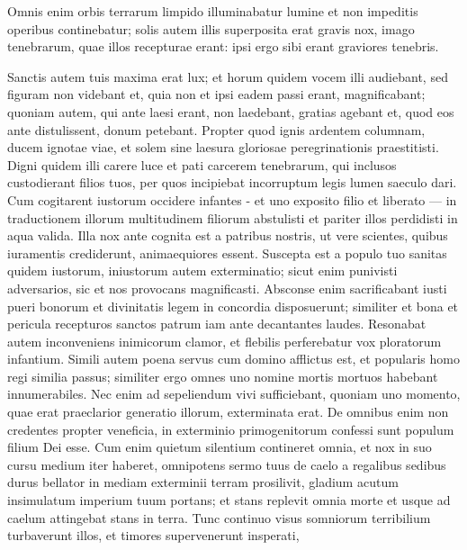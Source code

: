 \begin{biblechapter}
\begin{biblechapter}
\begin{biblechapter}
\begin{biblechapter}
\begin{biblechapter}
\begin{biblechapter}
\begin{biblechapter}
\begin{biblechapter}
\begin{biblechapter}
\begin{biblechapter}
\begin{biblechapter}
\begin{biblechapter}
\begin{biblechapter}
\begin{biblechapter}
\begin{biblechapter}
\begin{biblechapter}
\begin{biblechapter}
 \verse Omnis enim orbis terrarum limpido illuminabatur lumine
 et non impeditis operibus continebatur;
 \verse solis autem illis superposita erat gravis nox,
 imago tenebrarum, quae illos recepturae erant:
 ipsi ergo sibi erant graviores tenebris.
 
\begin{biblechapter}
\verse Sanctis autem tuis maxima erat lux;
 et horum quidem vocem illi audiebant, sed figuram non videbant
 et, quia non et ipsi eadem passi erant, magnificabant;
 \verse quoniam autem, qui ante laesi erant, non laedebant, gratias agebant
 et, quod eos ante distulissent, donum petebant.
 \verse Propter quod ignis ardentem columnam,
 ducem ignotae viae,
 et solem sine laesura gloriosae peregrinationis praestitisti.
 \verse Digni quidem illi carere luce
 et pati carcerem tenebrarum,
 qui inclusos custodierant filios tuos,
 per quos incipiebat incorruptum legis lumen saeculo dari.
 \verse Cum cogitarent iustorum occidere infantes
 - et uno exposito filio et liberato — in traductionem illorum multitudinem filiorum abstulisti
 et pariter illos perdidisti in aqua valida.
 \verse Illa nox ante cognita est a patribus nostris,
 ut vere scientes, quibus iuramentis crediderunt,
 animaequiores essent.
 \verse Suscepta est a populo tuo sanitas quidem iustorum,
 iniustorum autem exterminatio;
 \verse sicut enim punivisti adversarios,
 sic et nos provocans magnificasti.
 \verse Absconse enim sacrificabant iusti pueri bonorum
 et divinitatis legem in concordia disposuerunt;
 similiter et bona et pericula recepturos sanctos
 patrum iam ante decantantes laudes.
 \verse Resonabat autem inconveniens inimicorum clamor,
 et flebilis perferebatur vox ploratorum infantium.
 \verse Simili autem poena servus cum domino afflictus est,
 et popularis homo regi similia passus;
 \verse similiter ergo omnes uno nomine mortis
 mortuos habebant innumerabiles.
 Nec enim ad sepeliendum vivi sufficiebant,
 quoniam uno momento,
 quae erat praeclarior generatio illorum, exterminata erat.
 \verse De omnibus enim non credentes propter veneficia,
 in exterminio primogenitorum
 confessi sunt populum filium Dei esse.
 \verse Cum enim quietum silentium contineret omnia,
 et nox in suo cursu medium iter haberet,
 \verse omnipotens sermo tuus de caelo a regalibus sedibus
 durus bellator in mediam exterminii terram prosilivit,
 gladium acutum insimulatum imperium tuum portans;
 \verse et stans replevit omnia morte
 et usque ad caelum attingebat stans in terra.
 \verse Tunc continuo visus somniorum terribilium turbaverunt illos,
 et timores supervenerunt insperati,

\end{biblechapter}
\end{biblechapter}
\end{biblechapter}
\end{biblechapter}
\end{biblechapter}
\end{biblechapter}
\end{biblechapter}
\end{biblechapter}
\end{biblechapter}
\end{biblechapter}
\end{biblechapter}
\end{biblechapter}
\end{biblechapter}
\end{biblechapter}
\end{biblechapter}
\end{biblechapter}
\end{biblechapter}
\end{biblechapter}
